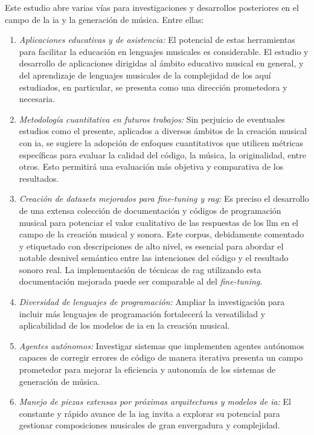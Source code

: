 Este estudio abre varias vías para investigaciones y desarrollos posteriores en el campo de la \gls{ia} y la generación de música. Entre ellas:

\begin{enumerate}
\item \textit{Aplicaciones educativas y de asistencia:} El potencial de estas herramientas para facilitar la educación en lenguajes musicales es considerable. El estudio y desarrollo de aplicaciones dirigidas al ámbito educativo musical en general, y del aprendizaje de lenguajes musicales de la complejidad de los aquí estudiados, en particular, se presenta como una dirección prometedora y necesaria.

\item \textit{Metodología cuantitativa en futuros trabajos:} Sin perjuicio de eventuales estudios como el presente, aplicados a diversos ámbitos de la creación musical con \gls{ia}, se sugiere la adopción de enfoques cuantitativos que utilicen métricas específicas para evaluar la calidad del código, la música, la originalidad, entre otros. Esto permitirá una evaluación más objetiva y comparativa de los resultados.

\item \textit{Creación de datasets mejorados para \emph{fine-tuning} y \gls{rag}:} Es preciso el desarrollo de una extensa colección de documentación y códigos de programación musical para potenciar el valor cualitativo de las respuestas de los \gls{llm} en el campo de la creación musical y sonora. Este corpus, debidamente comentado y etiquetado con descripciones de alto nivel, es esencial para abordar el notable desnivel semántico entre las intenciones del código y el resultado sonoro real. La implementación de técnicas de \gls{rag} utilizando esta documentación mejorada puede ser comparable al del \emph{fine-tuning}.

\item \textit{Diversidad de lenguajes de programación:} Ampliar la investigación para incluir más lenguajes de programación fortalecerá la versatilidad y aplicabilidad de los modelos de \gls{ia} en la creación musical.

\item \textit{Agentes autónomos:} Investigar sistemas que implementen agentes autónomos capaces de corregir errores de código de manera iterativa presenta un campo prometedor para mejorar la eficiencia y autonomía de los sistemas de generación de música.

\item \textit{Manejo de piezas extensas por próximas arquitecturas y modelos de \gls{ia}:} El constante y rápido avance de la \gls{iag} invita a explorar su potencial para gestionar composiciones musicales de gran envergadura y complejidad.


\end{enumerate}
